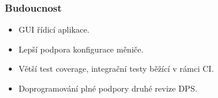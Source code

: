 \documentclass[%
  12pt,       				%
	t,                  %
	aspectratio=1610,   %
	unicode,						%
]{beamer}				    	%
\begin{document}
\begin{frame}
	\frametitle{Budoucnost}
	\begin{itemize}
		\item GUI řídicí aplikace.
		\item Lepší podpora konfigurace měniče.
		\item Větší test coverage, integrační testy běžící v rámci CI.
		\item Doprogramování plné podpory druhé revize DPS.
	\end{itemize}
\end{frame}

%
%
%
%
%
%
\end{document}
